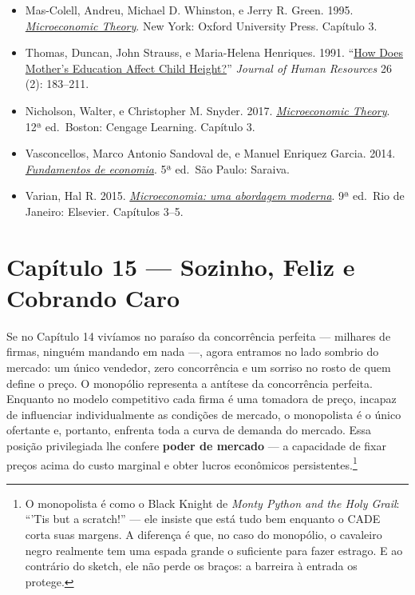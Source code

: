 \documentclass[11pt,twoside,openright]{book}
\begin{document}
\begin{itemize}
  IBGE --- Instituto Brasileiro de Geografia e Estatística. 2019.
  \href{https://www.ibge.gov.br/estatisticas/sociais/rendimento-despesa-e-consumo/9050-pesquisa-de-orcamentos-familiares.html}{\emph{Pesquisa
  de Orçamentos Familiares (POF) 2017--2018: Primeiros Resultados}}. Rio
  de Janeiro: IBGE.
\item
  Mas-Colell, Andreu, Michael D. Whinston, e Jerry R. Green. 1995.
  \href{https://books.google.com/books/about/Microeconomic_Theory.html?id=KGtegVXqD8wC}{\emph{Microeconomic
  Theory}}. New York: Oxford University Press. Capítulo 3.
\item
  Thomas, Duncan, John Strauss, e Maria-Helena Henriques. 1991.
  ``\href{https://doi.org/10.2307/145920}{How Does Mother's Education
  Affect Child Height?}'' \emph{Journal of Human Resources} 26 (2):
  183--211.
\item
  Nicholson, Walter, e Christopher M. Snyder. 2017.
  \href{https://books.google.com/books/about/Microeconomic_Theory_Basic_Principles_an.html?id=YdkhCwAAQBAJ}{\emph{Microeconomic
  Theory}}. 12ª ed.~Boston: Cengage Learning. Capítulo 3.
\item
  Vasconcellos, Marco Antonio Sandoval de, e Manuel Enriquez Garcia.
  2014.
  \href{https://books.google.com.br/books?id=LSb8oAEACAAJ}{\emph{Fundamentos
  de economia}}. 5ª ed.~São Paulo: Saraiva.
\item
  Varian, Hal R. 2015.
  \href{https://books.google.com/books/about/Intermediate_Microeconomics_with_Calculu.html?id=9mabDwAAQBAJ}{\emph{Microeconomia:
  uma abordagem moderna}}. 9ª ed.~Rio de Janeiro: Elsevier. Capítulos
  3--5.
\end{itemize}

\newpage

\chapter{Capítulo 15 --- Sozinho, Feliz e Cobrando
Caro}\label{capuxedtulo-15-sozinho-feliz-e-cobrando-caro}

Se no Capítulo 14 vivíamos no paraíso da concorrência perfeita ---
milhares de firmas, ninguém mandando em nada ---, agora entramos no lado
sombrio do mercado: um único vendedor, zero concorrência e um sorriso no
rosto de quem define o preço. O monopólio representa a antítese da
concorrência perfeita. Enquanto no modelo competitivo cada firma é uma
tomadora de preço, incapaz de influenciar individualmente as condições
de mercado, o monopolista é o único ofertante e, portanto, enfrenta toda
a curva de demanda do mercado. Essa posição privilegiada lhe confere
\textbf{poder de mercado} --- a capacidade de fixar preços acima do
custo marginal e obter lucros econômicos persistentes.\footnote{O
  monopolista é como o Black Knight de \emph{Monty Python and the Holy
  Grail}: ``'Tis but a scratch!'' --- ele insiste que está tudo bem
  enquanto o CADE corta suas margens. A diferença é que, no caso do
  monopólio, o cavaleiro negro realmente tem uma espada grande o
  suficiente para fazer estrago. E ao contrário do sketch, ele não perde
  os braços: a barreira à entrada os protege.}
\end{document}
